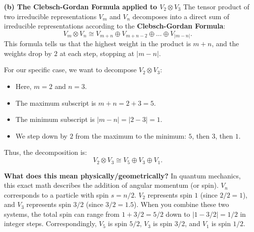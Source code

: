 \begin{solution}
\textbf{(b) The Clebsch-Gordan Formula applied to $V_2 \otimes V_3$}
The tensor product of two irreducible representations $V_m$ and $V_n$ decomposes into a direct sum of irreducible representations according to the \textbf{Clebsch-Gordan Formula}:
$$V_m \otimes V_n \cong V_{m+n} \oplus V_{m+n-2} \oplus \dots \oplus V_{|m-n|}.$$
This formula tells us that the highest weight in the product is $m+n$, and the weights drop by $2$ at each step, stopping at $|m-n|$.

For our specific case, we want to decompose $V_2 \otimes V_3$:
\begin{itemize}
    \item Here, $m = 2$ and $n = 3$.
    \item The maximum subscript is $m+n = 2+3 = 5$.
    \item The minimum subscript is $|m-n| = |2-3| = 1$.
    \item We step down by $2$ from the maximum to the minimum: $5$, then $3$, then $1$.
\end{itemize}

Thus, the decomposition is:
$$V_2 \otimes V_3 \cong V_5 \oplus V_3 \oplus V_1.$$

\textbf{What does this mean physically/geometrically?}
In quantum mechanics, this exact math describes the addition of angular momentum (or spin). $V_n$ corresponds to a particle with spin $s = n/2$. 
$V_2$ represents spin $1$ (since $2/2 = 1$), and $V_3$ represents spin $3/2$ (since $3/2 = 1.5$). 
When you combine these two systems, the total spin can range from $1 + 3/2 = 5/2$ down to $|1 - 3/2| = 1/2$ in integer steps. 
Correspondingly, $V_5$ is spin $5/2$, $V_3$ is spin $3/2$, and $V_1$ is spin $1/2$.
\end{solution}
